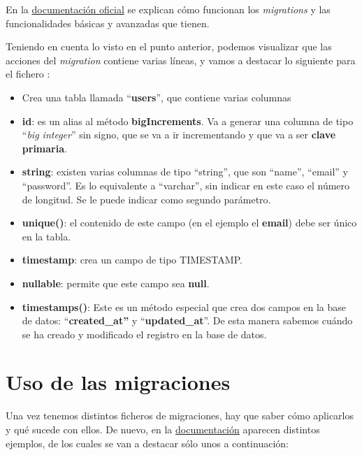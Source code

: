 En la \href{https://laravel.com/docs/10.x/migrations#tables}{documentación oficial} se explican cómo funcionan los \textit{migrations} y las funcionalidades básicas y avanzadas que tienen.

Teniendo en cuenta lo visto en el punto anterior, podemos visualizar que las acciones del \textit{migration} contiene varias líneas, y vamos a destacar lo siguiente para el fichero :

\begin{itemize}
    \item Crea una tabla llamada “\textbf{users}”, que contiene varias columnas
    \item \textbf{id}: es un alias al método \textbf{bigIncrements}. Va a generar una columna de tipo “\textit{big integer}” sin signo, que se va a ir incrementando y que va a ser \textbf{clave primaria}.

    \item \textbf{string}: existen varias columnas de tipo “string”, que son “name”, “email” y “password”. Es lo equivalente a “varchar”, sin indicar en este caso el número de longitud. Se le puede indicar como segundo parámetro.
    \item \textbf{unique()}: el contenido de este campo (en el ejemplo el \textbf{email}) debe ser único en la tabla.
    \item \textbf{timestamp}: crea un campo de tipo TIMESTAMP.
    \item \textbf{nullable}: permite que este campo sea \textbf{null}.

    \item \textbf{timestamps()}: Este es un método especial que crea dos campos en la base de datos: “\textbf{created\_at”} y “\textbf{updated\_at}”. De esta manera sabemos cuándo se ha creado y modificado el registro en la base de datos.
\end{itemize}


\section{Uso de las migraciones}

Una vez tenemos distintos ficheros de migraciones, hay que saber cómo aplicarlos y qué sucede con ellos. De nuevo, en la \href{https://laravel.com/docs/10.x/migrations#running-migrations}{documentación} aparecen distintos ejemplos, de los cuales se van a destacar sólo unos a continuación:

